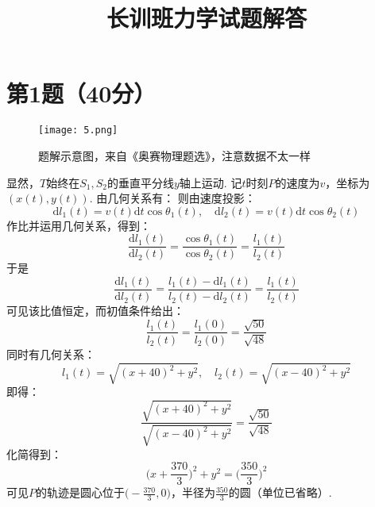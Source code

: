 \documentclass{ctexart}
\title{长训班力学试题解答}
\begin{document}
\maketitle

\section*{第1题（40分）}

\begin{figure}[H]
  \centering
  \texttt{[image: 5.png]}
\caption*{题解示意图，来自《奥赛物理题选》，注意数据不太一样}
\end{figure}
显然，$T$始终在$S_1,S_2$的垂直平分线$y$轴上运动. 记$t$时刻$P$的速度为$v$，坐标为$(x(t),y(t))$. 由几何关系有：
则由速度投影：
\begin{equation}

    \mathrm{d}l_1(t)=v(t)\mathrm{d}t \cos\theta_1(t),\quad \mathrm{d}l_2(t)=v(t)\mathrm{d}t \cos\theta_2(t)
    \tag{1.1}
\end{equation} 
作比并运用几何关系，得到：
\begin{equation}
    \frac{\mathrm{d}l_1(t)}{\mathrm{d}l_2(t)}=\frac{\cos\theta_1(t)}{\cos\theta_2(t)}=\frac{l_1(t)}{l_2(t)} 
    \tag{1.2}
\end{equation}
于是
\begin{equation}
  
    \frac{\mathrm{d}l_1(t)}{\mathrm{d}l_2(t)}=\frac{l_1(t)-\mathrm{d}l_1(t)}{l_2(t)-\mathrm{d}l_2(t)} =\frac{l_1(t)}{l_2(t)} 
    \tag{1.3}
\end{equation}
可见该比值恒定，而初值条件给出：
\begin{equation}
    \frac{l_1(t)}{l_2(t)}=\frac{l_1(0)}{l_2(0)}=\frac{\sqrt{50}}{\sqrt{48}} \tag{1.4}
\end{equation}
同时有几何关系：
\begin{equation}
    l_1(t)=\sqrt{(x+40)^2+y^2},\quad l_2(t)=\sqrt{(x-40)^2+y^2} \tag{1.5}
\end{equation}
即得：
\begin{equation}
    \frac{\sqrt{(x+40)^2+y^2}}{\sqrt{(x-40)^2+y^2}}=\frac{\sqrt{50}}{\sqrt{48}} \tag{1.6}
\end{equation}
化简得到：
\begin{equation}
    \Big(x+\frac{370}{3}\Big)^2+y^2=\Big(\frac{350}{3}\Big)^2 \tag{1.7}
\end{equation}
可见$P$的轨迹是圆心位于$\displaystyle \Big(-\frac{370}{3},0 \Big)$，半径为$\displaystyle\frac{350}{3}$的圆（单位已省略）.
\end{document}
